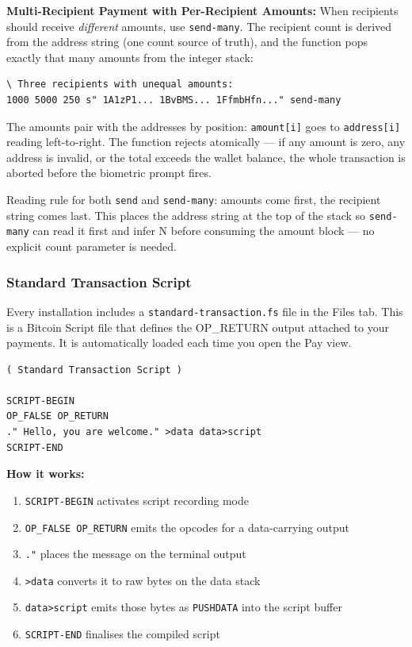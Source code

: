 \documentclass[a4paper, 11pt, openany]{book}
\begin{document}
\begin{notebox}
\textbf{Multi-Recipient Payment with Per-Recipient Amounts:} When recipients should receive \emph{different} amounts, use \texttt{send-many}. The recipient count is derived from the address string (one count source of truth), and the function pops exactly that many amounts from the integer stack:
\begin{lstlisting}
\ Three recipients with unequal amounts:
1000 5000 250 s" 1A1zP1... 1BvBMS... 1FfmbHfn..." send-many
\end{lstlisting}
The amounts pair with the addresses by position: \texttt{amount[i]} goes to \texttt{address[i]} reading left-to-right. The function rejects atomically --- if any amount is zero, any address is invalid, or the total exceeds the wallet balance, the whole transaction is aborted before the biometric prompt fires.

Reading rule for both \texttt{send} and \texttt{send-many}: amounts come first, the recipient string comes last. This places the address string at the top of the stack so \texttt{send-many} can read it first and infer N before consuming the amount block --- no explicit count parameter is needed.
\end{notebox}

\subsubsection{Standard Transaction Script}

Every installation includes a \texttt{standard-transaction.fs} file in the Files tab. This is a Bitcoin Script file that defines the OP\_RETURN output attached to your payments. It is automatically loaded each time you open the Pay view.

\begin{lstlisting}
( Standard Transaction Script )

SCRIPT-BEGIN
OP_FALSE OP_RETURN
." Hello, you are welcome." >data data>script
SCRIPT-END
\end{lstlisting}

\textbf{How it works:}
\begin{enumerate}
\item \texttt{SCRIPT-BEGIN} activates script recording mode
\item \texttt{OP\_FALSE OP\_RETURN} emits the opcodes for a data-carrying output
\item \texttt{."} places the message on the terminal output
\item \texttt{>data} converts it to raw bytes on the data stack
\item \texttt{data>script} emits those bytes as \texttt{PUSHDATA} into the script buffer
\item \texttt{SCRIPT-END} finalises the compiled script
\end{enumerate}
\end{document}
